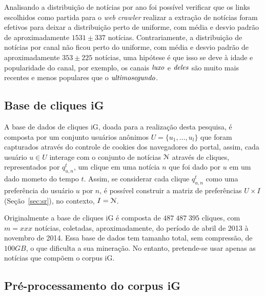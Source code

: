 \documentclass[normaltoc, espacoumemeio, pnumromarab,ruledheader]{abnt}
\begin{document}
Analisando a distribuição de notícias por ano foi possível verificar que os links escolhidos como partida para o \textit{web crawler} realizar a extração de notícias foram efetivos para deixar a distribuição perto de uniforme, com média e desvio padrão de aproximadamente $1531 \pm 337$ notícias.
Contrariamente, a distribuição de notícias por canal não ficou perto do uniforme, com média e desvio padrão de aproximadamente $353 \pm 225$ notícias, uma hipótese é que isso se deve à idade e popularidade do canal, por exemplo, os canais $\text{\textit{luxo}}$ e $\text{\textit{deles}}$ são muito mais recentes e menos populares que o $\text{\textit{ultimosegundo}}$.

\subsection{Base de cliques iG}
\label{subsec:basecliquesig}

A base de dados de cliques iG, doada para a realização desta pesquisa, é composta por um conjunto usuários anônimos $U = \{ u_1, \dots, u_l \}$ que foram capturados através do controle de cookies dos navegadores do portal, assim, cada usuário $u \in U$ interage com o conjunto de notícias ${\cal N}$ através de cliques, representados por $q_{u,n}^t$, um clique em uma notícia $n$ que foi dado por $u$ em um dado mometo do tempo $t$.
Assim, se considerar cada clique $q_{u,n}^t$ como uma preferência do usuário $u$ por $n$, é possível construir a matriz de preferências $U \times I$ (Seção~\ref{sec:sr}), no contexto, $I = {\cal N}$.

Originalmente a base de cliques iG é composta de $487\;487\;395$ cliques, com $m = xxx$ notícias, coletadas, aproximadamente, do período de abril de 2013 à novembro de 2014. Essa base de dados tem tamanho total, sem compressão, de $100GB$, o que dificulta a sua mineração. No entanto, pretende-se usar apenas as notícias que compõem o corpus iG.

\subsection{Pré-processamento do corpus iG}
\end{document}

